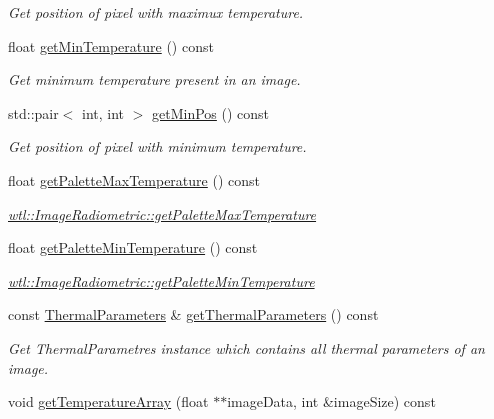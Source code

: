 \begin{DoxyCompactItemize}
\begin{DoxyCompactList}\small\item\em Get position of pixel with maximux temperature. \end{DoxyCompactList}\item 
float \hyperlink{classwtl_1_1_image_radiometric_af615da6d48d04f430d8806edcd3fa61e}{get\+Min\+Temperature} () const
\begin{DoxyCompactList}\small\item\em Get minimum temperature present in an image. \end{DoxyCompactList}\item 
std\+::pair$<$ int, int $>$ \hyperlink{classwtl_1_1_image_radiometric_a4f8f918914c3de913e781de02c42e846}{get\+Min\+Pos} () const
\begin{DoxyCompactList}\small\item\em Get position of pixel with minimum temperature. \end{DoxyCompactList}\item 
float \hyperlink{classwtl_1_1_image_radiometric_afaa9e2ee77818d64c856f941ac3c26a3}{get\+Palette\+Max\+Temperature} () const
\begin{DoxyCompactList}\small\item\em \hyperlink{classwtl_1_1_image_radiometric_afaa9e2ee77818d64c856f941ac3c26a3}{wtl\+::\+Image\+Radiometric\+::get\+Palette\+Max\+Temperature} \end{DoxyCompactList}\item 
float \hyperlink{classwtl_1_1_image_radiometric_a8e604d89775064734e7d09bdf0ddb868}{get\+Palette\+Min\+Temperature} () const
\begin{DoxyCompactList}\small\item\em \hyperlink{classwtl_1_1_image_radiometric_a8e604d89775064734e7d09bdf0ddb868}{wtl\+::\+Image\+Radiometric\+::get\+Palette\+Min\+Temperature} \end{DoxyCompactList}\item 
const \hyperlink{structwtl_1_1_thermal_parameters}{Thermal\+Parameters} \& \hyperlink{classwtl_1_1_image_radiometric_a5d450d8ec4e2eed79b2481000290e6e0}{get\+Thermal\+Parameters} () const
\begin{DoxyCompactList}\small\item\em Get Thermal\+Parametres instance which contains all thermal parameters of an image. \end{DoxyCompactList}\item 
void \hyperlink{classwtl_1_1_image_radiometric_ab0f5b66e57cccb1b210e27e869a1e440}{get\+Temperature\+Array} (float $\ast$$\ast$image\+Data, int \&image\+Size) const
$$
\end{DoxyCompactItemize}
